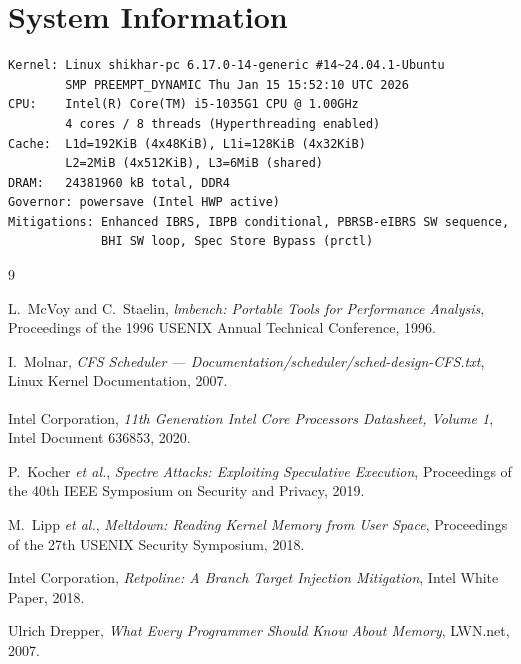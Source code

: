 \documentclass[12pt,a4paper]{article}
\begin{document}
\section{System Information}
\label{app:sysinfo}

\begin{verbatim}
Kernel: Linux shikhar-pc 6.17.0-14-generic #14~24.04.1-Ubuntu
        SMP PREEMPT_DYNAMIC Thu Jan 15 15:52:10 UTC 2026
CPU:    Intel(R) Core(TM) i5-1035G1 CPU @ 1.00GHz
        4 cores / 8 threads (Hyperthreading enabled)
Cache:  L1d=192KiB (4x48KiB), L1i=128KiB (4x32KiB)
        L2=2MiB (4x512KiB), L3=6MiB (shared)
DRAM:   24381960 kB total, DDR4
Governor: powersave (Intel HWP active)
Mitigations: Enhanced IBRS, IBPB conditional, PBRSB-eIBRS SW sequence,
             BHI SW loop, Spec Store Bypass (prctl)
\end{verbatim}

\begin{thebibliography}{9}

L.~McVoy and C.~Staelin,
\textit{lmbench: Portable Tools for Performance Analysis},
Proceedings of the 1996 USENIX Annual Technical Conference, 1996.

I.~Molnar,
\textit{CFS Scheduler — Documentation/scheduler/sched-design-CFS.txt},
Linux Kernel Documentation, 2007.

Intel Corporation,
\textit{11th Generation Intel\textsuperscript{\textregistered} Core\textsuperscript{\texttrademark}
Processors Datasheet, Volume 1},
Intel Document 636853, 2020.

P.~Kocher \textit{et al.},
\textit{Spectre Attacks: Exploiting Speculative Execution},
Proceedings of the 40th IEEE Symposium on Security and Privacy, 2019.

M.~Lipp \textit{et al.},
\textit{Meltdown: Reading Kernel Memory from User Space},
Proceedings of the 27th USENIX Security Symposium, 2018.

Intel Corporation,
\textit{Retpoline: A Branch Target Injection Mitigation},
Intel White Paper, 2018.

Ulrich Drepper,
\textit{What Every Programmer Should Know About Memory},
LWN.net, 2007.

\end{thebibliography}
\end{document}
